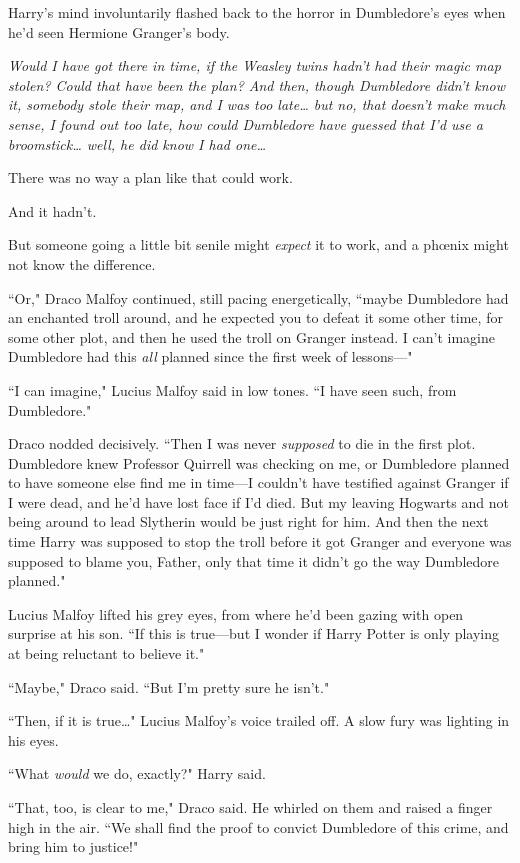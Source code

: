 Harry's mind involuntarily flashed back to the horror in Dumbledore's eyes when he'd seen Hermione Granger's body.

\emph{Would I have got there in time, if the Weasley twins hadn't had their magic map stolen? Could that have been the plan? And then, though Dumbledore didn't know it, somebody stole their map, and I was too late{\ldots} but no, that doesn't make much sense, I found out too late, how could Dumbledore have guessed that I'd use a broomstick{\ldots} well, he did know I had one{\ldots}}

There was no way a plan like that could work.

And it hadn't.

But someone going a little bit senile might \emph{expect} it to work, and a phœnix might not know the difference.

``Or," Draco Malfoy continued, still pacing energetically, ``maybe Dumbledore had an enchanted troll around, and he expected you to defeat it some other time, for some other plot, and then he used the troll on Granger instead. I can't imagine Dumbledore had this \emph{all} planned since the first week of lessons—"

``I can imagine," Lucius Malfoy said in low tones. ``I have seen such, from Dumbledore."

Draco nodded decisively. ``Then I was never \emph{supposed} to die in the first plot. Dumbledore knew Professor Quirrell was checking on me, or Dumbledore planned to have someone else find me in time—I couldn't have testified against Granger if I were dead, and he'd have lost face if I'd died. But my leaving Hogwarts and not being around to lead Slytherin would be just right for him. And then the next time Harry was supposed to stop the troll before it got Granger and everyone was supposed to blame you, Father, only that time it didn't go the way Dumbledore planned."

Lucius Malfoy lifted his grey eyes, from where he'd been gazing with open surprise at his son. ``If this is true—but I wonder if Harry Potter is only playing at being reluctant to believe it."

``Maybe," Draco said. ``But I'm pretty sure he isn't."

``Then, if it is true{\ldots}" Lucius Malfoy's voice trailed off. A slow fury was lighting in his eyes.

``What \emph{would} we do, exactly?" Harry said.

``That, too, is clear to me," Draco said. He whirled on them and raised a finger high in the air. ``We shall find the proof to convict Dumbledore of this crime, and bring him to justice!"

